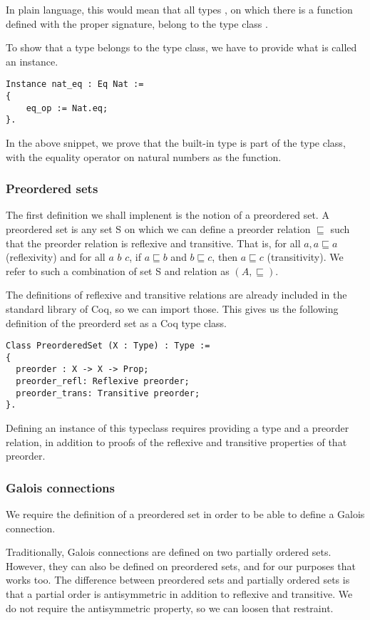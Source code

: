In plain language, this would mean that all types , on which there is a
function  defined with the proper signature, belong to the type
class . 

To show that a type belongs to the type class, we have to provide what is
called an instance.

\begin{verbatim}
Instance nat_eq : Eq Nat :=
{
	eq_op := Nat.eq;
}.
\end{verbatim}

In the above snippet, we prove that the built-in  type is part of
the  type class, with the equality operator on natural numbers as the
 function.

\subsubsection{Preordered sets}
The first definition we shall implenent is the notion of a preordered set. 
A preordered set is any set S on which we can define a preorder relation
$\sqsubseteq$ such that the preorder relation is reflexive and transitive. That
is, for all $a, a \sqsubseteq a$ (reflexivity) and for all $a$ $b$ $c$, if $a
\sqsubseteq b$ and $b \sqsubseteq c$, then $a \sqsubseteq c$ (transitivity).
We refer to such a combination of set S and relation as $(A, \sqsubseteq)$.

The definitions of reflexive and transitive relations are already included in
the standard library of Coq, so we can import those. This gives us the
following definition of the preorderd set as a Coq type class.

\begin{verbatim}
Class PreorderedSet (X : Type) : Type :=
{
  preorder : X -> X -> Prop;
  preorder_refl: Reflexive preorder;
  preorder_trans: Transitive preorder;
}.
\end{verbatim}

Defining an instance of this typeclass requires providing a type and a preorder
relation, in addition to proofs of the reflexive and transitive properties of
that preorder. 

\subsubsection{Galois connections}
We require the definition of a preordered set in order to be able to define a
Galois connection.

Traditionally, Galois connections are defined on two partially ordered sets.
However, they can also be defined on preordered sets, and for our purposes that
works too. The difference between preordered sets and partially ordered sets is
that a partial order is antisymmetric in addition to reflexive and transitive.
We do not require the antisymmetric property, so we can loosen that restraint.

